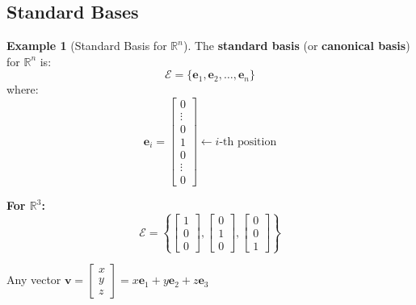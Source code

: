 \documentclass[12pt,a4paper]{article}
\theoremstyle{definition}
\newtheorem{example}{Example}[section]
\begin{document}
\subsection{Standard Bases}

\begin{example}[Standard Basis for $\mathbb{R}^n$]
The \textbf{standard basis} (or \textbf{canonical basis}) for $\mathbb{R}^n$ is:
\begin{equation}
\mathcal{E} = \{\mathbf{e}_1, \mathbf{e}_2, \ldots, \mathbf{e}_n\}
\end{equation}
where:
\begin{equation}
\mathbf{e}_i = \begin{bmatrix} 0 \\ \vdots \\ 0 \\ 1 \\ 0 \\ \vdots \\ 0 \end{bmatrix} \leftarrow \text{$i$-th position}
\end{equation}

\textbf{For $\mathbb{R}^3$:}
\begin{equation}
\mathcal{E} = \left\{\begin{bmatrix} 1 \\ 0 \\ 0 \end{bmatrix}, \begin{bmatrix} 0 \\ 1 \\ 0 \end{bmatrix}, \begin{bmatrix} 0 \\ 0 \\ 1 \end{bmatrix}\right\}
\end{equation}

Any vector $\mathbf{v} = \begin{bmatrix} x \\ y \\ z \end{bmatrix} = x\mathbf{e}_1 + y\mathbf{e}_2 + z\mathbf{e}_3$
\end{example}
\end{document}
